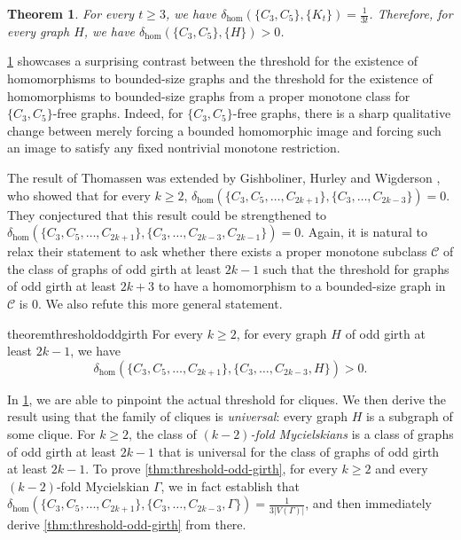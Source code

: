 \documentclass{article}
\newtheorem{theorem}{Theorem}[section]
\begin{document}
\begin{theorem}\label{thm:threshold-Kt}
    For every $t \geq 3$, we have $\delta_{\hom}(\{C_3, C_5\}, \{K_t\})  = \frac{1}{3t}$.
    Therefore, for every graph $H$, we have $\delta_{\hom}(\{C_3, C_5\}, \{H\}) > 0$.
\end{theorem}

\cref{thm:threshold-Kt} showcases a surprising contrast between the threshold for the existence of homomorphisms to bounded-size graphs and the threshold for the existence of homomorphisms to bounded-size graphs from a proper monotone class for $\{C_3, C_5\}$-free graphs.
Indeed, for $\{C_3,C_5\}$-free graphs, there is a sharp qualitative change between merely forcing a bounded homomorphic image and forcing such an image to satisfy any fixed nontrivial monotone restriction.

The result of Thomassen was extended by Gishboliner, Hurley and Wigderson \cite{GHW26}, who showed that for every $k \geq 2$, $\delta_{\hom}(\{C_3, C_5, \ldots, C_{2k+1}\}, \{C_3, \ldots, C_{2k-3}\}) = 0$.
They conjectured that this result could be strengthened to $\delta_{\hom}(\{C_3, C_5, \ldots, C_{2k+1}\}, \{C_3, \ldots, C_{2k-3}, C_{2k-1}\}) = 0$.
Again, it is natural to relax their statement to ask whether there exists a proper monotone subclass $\mathcal{C}$ of the class of graphs of odd girth at least $2k-1$ such that the threshold for graphs of odd girth at least $2k+3$ to have a homomorphism to a bounded-size graph in $\mathcal{C}$ is $0$.
We also refute this more general statement.

\begin{restatable}{theorem}{thresholdoddgirth}\label{thm:threshold-odd-girth}
    For every $k \geq 2$, for every graph $H$ of odd girth at least $2k-1$, we have \[\delta_{\hom}(\{C_3, C_5, \ldots, C_{2k+1}\}, \{C_3, \ldots, C_{2k-3}, H\}) > 0.\]
\end{restatable}

In \cref{thm:threshold-Kt}, we are able to pinpoint the actual threshold for cliques. 
We then derive the result using that the family of cliques is \emph{universal}: every graph $H$ is a subgraph of some clique.
For $k \geq 2$, the class of \emph{$(k-2)$-fold Mycielskians} is a class of graphs of odd girth at least $2k-1$ that is universal for the class of graphs of odd girth at least $2k-1$.
To prove \cref{thm:threshold-odd-girth}, for every $k \geq 2$ and every $(k-2)$-fold Mycielskian $\Gamma$, we in fact establish that $\delta_{\hom}(\{C_3, C_5, \ldots, C_{2k+1}\}, \{C_3, \ldots, C_{2k-3}, \Gamma\})  = \frac{1}{3|V(\Gamma)|}$, and then immediately derive \cref{thm:threshold-odd-girth} from there.
\end{document}
